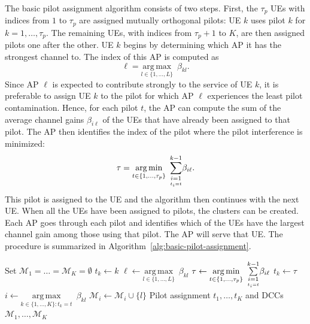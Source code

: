 The basic pilot assignment algorithm consists of two steps. First, the $\tau_p$ UEs with indices from $1$ to $\tau_p$ are assigned mutually orthogonal pilots: UE $k$ uses pilot $k$ for $k=1,\ldots,\tau_p$.
The remaining UEs, with indices from $\tau_p+1$ to $K$, are then assigned pilots one after the other. UE $k$ begins by determining which AP it has the strongest channel to. The index of this AP is computed as
\begin{equation} \label{eq:Master-AP}
\ell = \underset{l\in\{1,\ldots,L\}}{\mathrm{arg \, max}} \,\,\,  \beta_{kl}.
\end{equation}
Since AP $\ell$ is expected to contribute strongly to the service of UE $k$, it is preferable to assign UE $k$ to the pilot for which AP $\ell$ experiences the least pilot contamination. Hence, for each pilot $t$, the AP can compute the sum of the average channel gains $\beta_{i \ell}$ of the UEs that have already been assigned to that pilot. The AP then identifies the index of the pilot where the pilot interference is minimized:
\begin{equation} \label{eq:preferred-pilot}
\tau = \underset{t\in\{1,\ldots,\tau_p\}}{\mathrm{arg \, min}} \,\,\, \condSum{i=1}{t_i = t}{k-1} \beta_{i \ell}.
\end{equation}
This pilot is assigned to the UE and the algorithm then continues with the next UE. When all the UEs have been assigned to pilots, the clusters can be created. Each AP goes through each pilot and identifies which of the UEs have the largest channel gain among those using that pilot. The AP will serve that UE.
The procedure is summarized in Algorithm~\ref{alg:basic-pilot-assignment}.

\begin{algorithm}
	\caption{Basic pilot assignment and cooperation clustering} \label{alg:basic-pilot-assignment}
	\begin{algorithmic}[1]
	 Set $\mathcal{M}_1 = \ldots = \mathcal{M}_K = \emptyset$
		\State $t_k \gets k$ 
	\EndFor
		\State $\ell \gets \underset{l\in\{1,\ldots,L\}}{\mathrm{arg \, max}} \,\,\, \beta_{kl}$ 
		\State $\tau \gets \underset{t\in\{1,\ldots,\tau_p\}}{\mathrm{arg \, min}} \,\,\, \condSum{i=1}{t_i = t}{k-1} \beta_{i \ell}$ 
		\State $t_k \gets \tau$ 
	\EndFor
			\State $i \gets \underset{k\in\{1,\ldots,K\} : t_k = t}{\mathrm{arg \, max}}  \,\,\, \beta_{k l}$ 
			\State $\mathcal{M}_i \gets \mathcal{M}_i  \cup \{ l \}$
		\EndFor
	\EndFor
		 Pilot assignment $t_1,\ldots,t_K$ and DCCs $\mathcal{M}_1,\ldots,\mathcal{M}_K $
	\end{algorithmic}
\end{algorithm}


